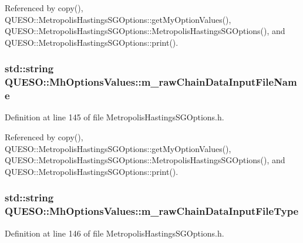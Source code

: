 Referenced by copy(), Q\-U\-E\-S\-O\-::\-Metropolis\-Hastings\-S\-G\-Options\-::get\-My\-Option\-Values(), Q\-U\-E\-S\-O\-::\-Metropolis\-Hastings\-S\-G\-Options\-::\-Metropolis\-Hastings\-S\-G\-Options(), and Q\-U\-E\-S\-O\-::\-Metropolis\-Hastings\-S\-G\-Options\-::print().

\hypertarget{class_q_u_e_s_o_1_1_mh_options_values_a3d031c2cdc8f17c589e999d11782c8ba}{
\subsubsection[{m\-\_\-raw\-Chain\-Data\-Input\-File\-Name}]{\setlength{\rightskip}{0pt plus 5cm}std\-::string Q\-U\-E\-S\-O\-::\-Mh\-Options\-Values\-::m\-\_\-raw\-Chain\-Data\-Input\-File\-Name}}\label{class_q_u_e_s_o_1_1_mh_options_values_a3d031c2cdc8f17c589e999d11782c8ba}


Definition at line 145 of file Metropolis\-Hastings\-S\-G\-Options.\-h.



Referenced by copy(), Q\-U\-E\-S\-O\-::\-Metropolis\-Hastings\-S\-G\-Options\-::get\-My\-Option\-Values(), Q\-U\-E\-S\-O\-::\-Metropolis\-Hastings\-S\-G\-Options\-::\-Metropolis\-Hastings\-S\-G\-Options(), and Q\-U\-E\-S\-O\-::\-Metropolis\-Hastings\-S\-G\-Options\-::print().

\hypertarget{class_q_u_e_s_o_1_1_mh_options_values_a61974cb51a10d03dcd317dcd10f2684f}{
\subsubsection[{m\-\_\-raw\-Chain\-Data\-Input\-File\-Type}]{\setlength{\rightskip}{0pt plus 5cm}std\-::string Q\-U\-E\-S\-O\-::\-Mh\-Options\-Values\-::m\-\_\-raw\-Chain\-Data\-Input\-File\-Type}}\label{class_q_u_e_s_o_1_1_mh_options_values_a61974cb51a10d03dcd317dcd10f2684f}


Definition at line 146 of file Metropolis\-Hastings\-S\-G\-Options.\-h.



